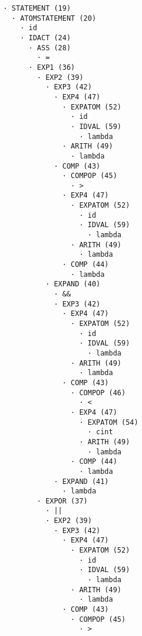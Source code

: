 \begin{enumerate}
\begin{tcolorbox}[title={Árbol sintáctico}, colback=white, breakable]
\begin{lstlisting}
                · STATEMENT (19)
                  · ATOMSTATEMENT (20)
                    · id
                    · IDACT (24)
                      · ASS (28)
                        · =
                      · EXP1 (36)
                        · EXP2 (39)
                          · EXP3 (42)
                            · EXP4 (47)
                              · EXPATOM (52)
                                · id
                                · IDVAL (59)
                                  · lambda
                              · ARITH (49)
                                · lambda
                            · COMP (43)
                              · COMPOP (45)
                                · >
                              · EXP4 (47)
                                · EXPATOM (52)
                                  · id
                                  · IDVAL (59)
                                    · lambda
                                · ARITH (49)
                                  · lambda
                              · COMP (44)
                                · lambda
                          · EXPAND (40)
                            · &&
                            · EXP3 (42)
                              · EXP4 (47)
                                · EXPATOM (52)
                                  · id
                                  · IDVAL (59)
                                    · lambda
                                · ARITH (49)
                                  · lambda
                              · COMP (43)
                                · COMPOP (46)
                                  · <
                                · EXP4 (47)
                                  · EXPATOM (54)
                                    · cint
                                  · ARITH (49)
                                    · lambda
                                · COMP (44)
                                  · lambda
                            · EXPAND (41)
                              · lambda
                        · EXPOR (37)
                          · ||
                          · EXP2 (39)
                            · EXP3 (42)
                              · EXP4 (47)
                                · EXPATOM (52)
                                  · id
                                  · IDVAL (59)
                                    · lambda
                                · ARITH (49)
                                  · lambda
                              · COMP (43)
                                · COMPOP (45)
                                  · >

\end{lstlisting}
\end{tcolorbox}
\end{enumerate}
